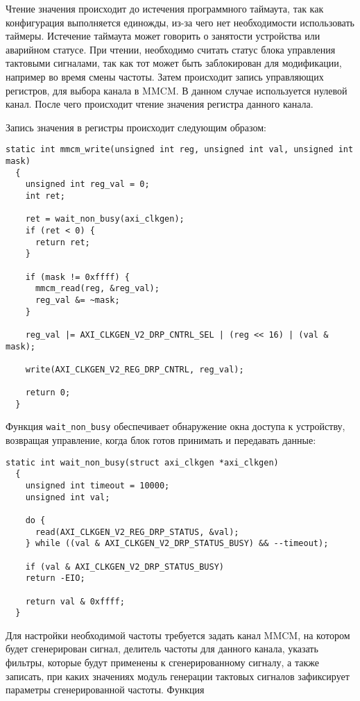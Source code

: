 Чтение значения происходит до истечения программного таймаута, так как
конфигурация выполняется единожды, из-за чего нет необходимости использовать
таймеры. Истечение таймаута может говорить о занятости устройства или аварийном статусе.
При чтении, необходимо считать статус блока управления тактовыми сигналами,
так как тот может быть заблокирован для модификации, например во время смены частоты.
Затем происходит запись управляющих регистров, для выбора канала в MMCM. В данном
случае используется нулевой канал. После чего происходит чтение значения регистра данного
канала.

Запись значения в регистры происходит следующим образом:
\medskip
\begin{lstlisting}[style=C]
  static int mmcm_write(unsigned int reg, unsigned int val, unsigned int mask)
  {
	unsigned int reg_val = 0;
	int ret;

	ret = wait_non_busy(axi_clkgen);
	if (ret < 0) {
      return ret;
    }

	if (mask != 0xffff) {
      mmcm_read(reg, &reg_val);
      reg_val &= ~mask;
	}

	reg_val |= AXI_CLKGEN_V2_DRP_CNTRL_SEL | (reg << 16) | (val & mask);

	write(AXI_CLKGEN_V2_REG_DRP_CNTRL, reg_val);

	return 0;
  }
\end{lstlisting}
\medskip

Функция \texttt{wait\_non\_busy} обеспечивает обнаружение окна доступа к устройству,
возвращая управление, когда блок готов принимать и передавать данные:
\medskip
\begin{lstlisting}[style=C]
  static int wait_non_busy(struct axi_clkgen *axi_clkgen)
  {
	unsigned int timeout = 10000;
	unsigned int val;

	do {
      read(AXI_CLKGEN_V2_REG_DRP_STATUS, &val);
	} while ((val & AXI_CLKGEN_V2_DRP_STATUS_BUSY) && --timeout);

	if (val & AXI_CLKGEN_V2_DRP_STATUS_BUSY)
    return -EIO;

	return val & 0xffff;
  }
\end{lstlisting}
\medskip

Для настройки необходимой частоты требуется задать канал MMCM, на котором
будет сгенерирован сигнал, делитель частоты для данного канала, указать
фильтры, которые будут применены к сгенерированному сигналу, а также
записать, при каких значениях модуль генерации тактовых сигналов
зафиксирует параметры сгенерированной частоты. Функция